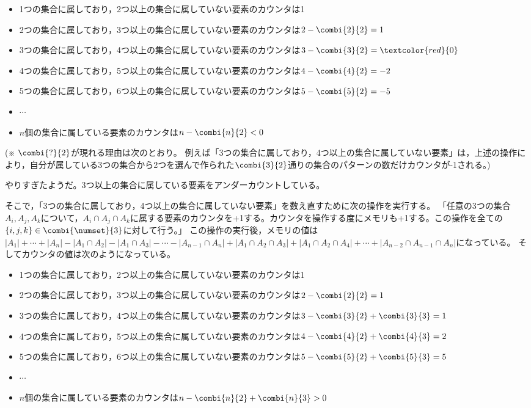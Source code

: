                 \begin{itemize}
                    \item 1つの集合に属しており，2つ以上の集合に属していない要素のカウンタは1
                    \item 2つの集合に属しており，3つ以上の集合に属していない要素のカウンタは$2-\combi{2}{2}=1$
                    \item 3つの集合に属しており，4つ以上の集合に属していない要素のカウンタは$3-\combi{3}{2}=\textcolor{red}{0}$
                    \item 4つの集合に属しており，5つ以上の集合に属していない要素のカウンタは$4-\combi{4}{2}=-2$
                    \item 5つの集合に属しており，6つ以上の集合に属していない要素のカウンタは$5-\combi{5}{2}=-5$
                    \item $\cdots$
                    \item $n$個の集合に属している要素のカウンタは$n - \combi{n}{2} < 0$
                \end{itemize}
                (※ $\combi{?}{2}$が現れる理由は次のとおり。
                例えば「3つの集合に属しており，4つ以上の集合に属していない要素」は，上述の操作により，自分が属している3つの集合から2つを選んで作られた$\combi{3}{2}$通りの集合のパターンの数だけカウンタが-1される。)
                \par
                やりすぎたようだ。3つ以上の集合に属している要素をアンダーカウントしている。
                \par
                そこで，「3つの集合に属しており，4つ以上の集合に属していない要素」を数え直すために次の操作を実行する。
                「任意の3つの集合$A_i,A_j,A_k$について，$A_i\cap A_j\cap A_k$に属する要素のカウンタを+1する。カウンタを操作する度にメモリも+1する。この操作を全ての$\{i,j,k\}\in\combi{\numset}{3}$に対して行う。」
                この操作の実行後，メモリの値は$|A_1|+\dotsb +|A_n| - |A_1\cap A_2| - |A_1\cap A_3| - \dotsb - |A_{n-1}\cap A_n| + |A_1\cap A_2\cap A_3| + |A_1\cap A_2\cap A_4| + \dotsb + |A_{n-2}\cap A_{n-1}\cap A_n|$になっている。
                そしてカウンタの値は次のようになっている。
                \begin{itemize}
                    \item 1つの集合に属しており，2つ以上の集合に属していない要素のカウンタは1
                    \item 2つの集合に属しており，3つ以上の集合に属していない要素のカウンタは$2-\combi{2}{2}=1$
                    \item 3つの集合に属しており，4つ以上の集合に属していない要素のカウンタは$3-\combi{3}{2}+\combi{3}{3}=1$
                    \item 4つの集合に属しており，5つ以上の集合に属していない要素のカウンタは$4-\combi{4}{2}+\combi{4}{3}=2$
                    \item 5つの集合に属しており，6つ以上の集合に属していない要素のカウンタは$5-\combi{5}{2}+\combi{5}{3}=5$
                    \item $\cdots$
                    \item $n$個の集合に属している要素のカウンタは$n - \combi{n}{2} +\combi{n}{3} > 0$
                \end{itemize}
